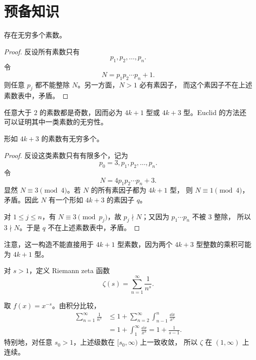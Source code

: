 \section{预备知识}

\begin{theorem}\label{thm:infinitely-many-primes}
	存在无穷多个素数。
\end{theorem}

\begin{proof}
	反设所有素数只有
	\[
	p_1,p_2,\ldots,p_n.
	\]
	令
	\[
	N=p_1p_2\cdots p_n+1.
	\]
	则任意 $p_j$ 都不能整除 $N$。另一方面，$N>1$ 必有素因子，
	而这个素因子不在上述素数表中，矛盾。
\end{proof}

任意大于 $2$ 的素数都是奇数，因而必为 $4k+1$ 型或
$4k+3$ 型。Euclid 的方法还可以证明其中一类素数的无穷性。

\begin{proposition}\label{prop:infinitely-many-primes-3-mod-4}
	形如 $4k+3$ 的素数有无穷多个。
\end{proposition}

\begin{proof}
	反设这类素数只有有限多个，记为
	\[
	p_0=3,p_1,p_2,\ldots,p_n.
	\]
	令
	\[
	N=4p_1p_2\cdots p_n+3.
	\]
	显然 $N\equiv3\pmod 4$。若 $N$ 的所有素因子都为 $4k+1$ 型，
	则 $N\equiv1\pmod 4$，矛盾。因此 $N$ 有一个形如 $4k+3$
	的素因子 $q$。

	对 $1\leq j\leq n$，有 $N\equiv3\pmod{p_j}$，故
	$p_j\nmid N$；又因为 $p_1\cdots p_n$ 不被 $3$ 整除，
	所以 $3\nmid N$。于是 $q$ 不在上述素数表中，矛盾。
\end{proof}

注意，这一构造不能直接用于 $4k+1$ 型素数，因为两个
$4k+3$ 型整数的乘积可能为 $4k+1$ 型。

\begin{definition}\label{def:riemann-zeta-real}
	对 $s>1$，定义 Riemann zeta 函数
	\[
	\zeta(s)=\sum_{n=1}^{\infty}\frac1{n^s}.
	\]
\end{definition}

取 $f(x)=x^{-s}$。由积分比较，
\[
\begin{aligned}
\sum_{n=1}^{\infty}\frac1{n^s}
&\leq 1+\sum_{n=2}^{\infty}\int_{n-1}^{n}\frac{\dd x}{x^s}\\
&=1+\int_1^{\infty}\frac{\dd x}{x^s}
=1+\frac1{s-1}.
\end{aligned}
\]
特别地，对任意 $s_0>1$，上述级数在 $[s_0,\infty)$ 上一致收敛，
所以 $\zeta$ 在 $(1,\infty)$ 上连续。

